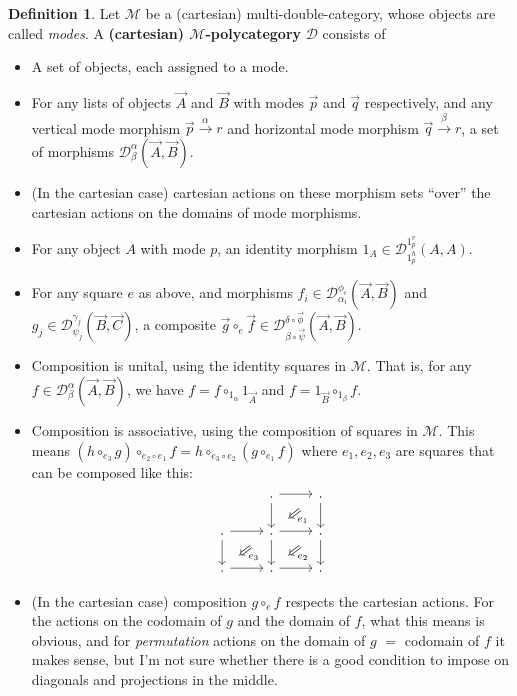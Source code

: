 \documentclass{article}
\theoremstyle{definition}
\newtheorem{defn}{Definition}
\def\M{\mathcal{M}}
\def\D{\mathcal{D}}
\def\DD#1#2{\mathcal{D}^{#1}_{#2}}
\let\xto\xrightarrow
\begin{document}
\begin{defn}
  Let $\M$ be a (cartesian) multi-double-category, whose objects are called \emph{modes}.
  A \textbf{(cartesian) $\M$-polycategory} $\D$ consists of
  \begin{itemize}
  \item A set of objects, each assigned to a mode.
  \item For any lists of objects $\vec{A}$ and $\vec{B}$ with modes $\vec{p}$ and $\vec{q}$ respectively, and any vertical mode morphism $\vec{p} \xto{\alpha} r$ and horizontal mode morphism $\vec{q} \xto{\beta} r$, a set of morphisms $\DD\alpha\beta(\vec{A},\vec{B})$.
  \item (In the cartesian case) cartesian actions on these morphism sets ``over'' the cartesian actions on the domains of mode morphisms.
  \item For any object $A$ with mode $p$, an identity morphism $1_A \in \DD{1_p^v}{1_p^h}(A,A)$.
  \item For any square $e$ as above, and morphisms $f_i \in \DD{\phi_i}{\alpha_i}(\vec{A},\vec{B})$ and $g_j \in \DD{\gamma_j}{\psi_j}(\vec{B},\vec{C})$, a composite $\vec{g} \circ_e \vec{f} \in \DD{\delta\circ \vec{\phi}}{\beta\circ\vec{\psi}}(\vec{A},\vec{B})$.
  \item Composition is unital, using the identity squares in $\M$.
    That is, for any $f\in\DD{\alpha}{\beta}(\vec{A},\vec{B})$, we have $f = f \circ_{1_\alpha} 1_{\vec{A}}$ and $f = 1_{\vec{B}} \circ_{1_\beta} f$.
  \item Composition is associative, using the composition of squares in $\M$.
    This means $(h\circ_{e_3}g)\circ_{e_2 \circ e_1} f = h\circ_{e_3\circ e_2} (g\circ_{e_1} f)$ where $e_1,e_2,e_3$ are squares that can be composed like this:
    \[\begin{tikzcd}
       & . \ar[r] \ar[d]
      \ar[from=r,to=d,phantom,""{name=1,near start},""{name=2,near end}]
      \ar[Rightarrow,from=1,to=2,"e_1"]
      & .\ar[d] \\
      .\ar[r] \ar[d]
      \ar[from=r,to=d,phantom,""{name=3,near start},""{name=4,near end}]
      \ar[Rightarrow,from=3,to=4,"e_3"]
      & .\ar[r] \ar[d]
      \ar[from=r,to=d,phantom,""{name=5,near start},""{name=6,near end}]
      \ar[Rightarrow,from=5,to=6,"e_2"]
      & .\ar[d] \\
      .\ar[r] & .\ar[r] & .
    \end{tikzcd}\]
  \item (In the cartesian case) composition $g\circ_e f$ respects the cartesian actions.
    For the actions on the codomain of $g$ and the domain of $f$, what this means is obvious, and for \emph{permutation} actions on the domain of $g$ $=$ codomain of $f$ it makes sense, but I'm not sure whether there is a good condition to impose on diagonals and projections in the middle.
  \end{itemize}
\end{defn}
\end{document}
